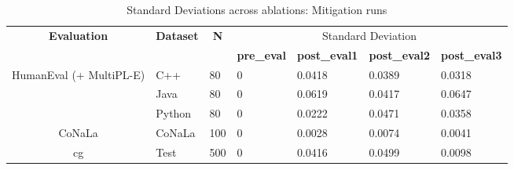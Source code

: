 \begin{table}[H]
\centering
\caption{Standard Deviations across ablations: Mitigation runs}
\begin{tabular}{|c|l|l|llll|}
\hline
\multirow{2}{*}{\textbf{Evaluation}}       & \multicolumn{1}{c|}{\multirow{2}{*}{\textbf{Dataset}}} & \multicolumn{1}{c|}{\multirow{2}{*}{\textbf{N}}} & \multicolumn{4}{c|}{Standard   Deviation}                                                                                                              \\ \cline{4-7} 
                                           & \multicolumn{1}{c|}{}                                  & \multicolumn{1}{c|}{}                            & \multicolumn{1}{l|}{\textbf{pre\_eval}} & \multicolumn{1}{l|}{\textbf{post\_eval1}} & \multicolumn{1}{l|}{\textbf{post\_eval2}} & \textbf{post\_eval3} \\ \hline
\multirow{3}{*}{HumanEval   (+ MultiPL-E)} & C++                                                    & 80                                               & \multicolumn{1}{l|}{0}                  & \multicolumn{1}{l|}{0.0418}               & \multicolumn{1}{l|}{0.0389}               & 0.0318               \\ \cline{2-7} 
                                           & Java                                                   & 80                                               & \multicolumn{1}{l|}{0}                  & \multicolumn{1}{l|}{0.0619}               & \multicolumn{1}{l|}{0.0417}               & 0.0647               \\ \cline{2-7} 
                                           & Python                                                 & 80                                               & \multicolumn{1}{l|}{0}                  & \multicolumn{1}{l|}{0.0222}               & \multicolumn{1}{l|}{0.0471}               & 0.0358               \\ \hline
CoNaLa                                     & CoNaLa                                                 & 100                                              & \multicolumn{1}{l|}{0}                  & \multicolumn{1}{l|}{0.0028}               & \multicolumn{1}{l|}{0.0074}               & 0.0041               \\ \hline
\multirow{2}{*}{cg}                        & Test                                                   & 500                                              & \multicolumn{1}{l|}{0}                  & \multicolumn{1}{l|}{0.0416}               & \multicolumn{1}{l|}{0.0499}               & 0.0098               \\ \cline{2-7} 

\end{tabular}
\end{table}
